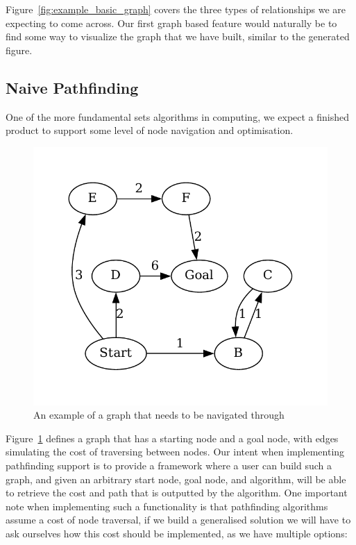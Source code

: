 Figure~\ref{fig:example_basic_graph} covers the three types of relationships we are expecting to come across.
Our first graph based feature would naturally be to find some way to visualize the graph that we have built, similar to
the generated figure.

\subsection{Naive Pathfinding}\label{subsec:naive-pathfinding}
One of the more fundamental sets algorithms in computing, we expect a finished product to support some level of node
navigation and optimisation.

\begin{figure}[H]
    \centering
    \includegraphics[width=12cm]{figures/example_graphs/pathfinding.gv}
    \caption{An example of a graph that needs to be navigated through}
    \label{fig:example_pathfinding_graph}
\end{figure}

Figure~\ref{fig:example_pathfinding_graph} defines a graph that has a starting node and a goal node, with edges
simulating the cost of traversing between nodes.
Our intent when implementing pathfinding support is to provide a framework where a user can build such a graph, and
given an arbitrary start node, goal node, and algorithm, will be able to retrieve the cost and path that is outputted by
the algorithm.
One important note when implementing such a functionality is that pathfinding algorithms assume a cost of node
traversal, if we build a generalised solution we will have to ask ourselves how this cost should be implemented, as we
have multiple options:

